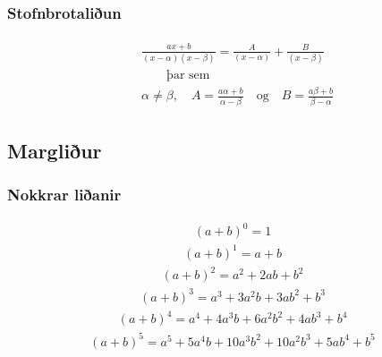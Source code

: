 \documentclass[a4paper,10pt,icelandic]{sphinxmanual}
\begin{document}
\subsubsection{Stofnbrotaliðun}
\label{\detokenize{Kafli12:stofnbrotaliun}}\begin{equation*}
\begin{split}\begin{aligned}
&\frac{ax+b}{(x-\alpha)(x-\beta)} = \frac{A}{(x-\alpha)}+ \frac{B}{(x-\beta)} \\
&\qquad \text{þar sem} \\
& \alpha \neq \beta, \quad A= \frac{a\alpha + b}{\alpha - \beta} \quad \text{og} \quad B= \frac{a\beta + b}{\beta - \alpha}
\end{aligned}\end{split}
\end{equation*}

\subsection{Margliður}
\label{\detokenize{Kafli12:margliur}}

\subsubsection{Nokkrar liðanir}
\label{\detokenize{Kafli12:nokkrar-lianir}}\begin{equation*}
\begin{split}(a + b)^0 = 1\end{split}
\end{equation*}\begin{equation*}
\begin{split}(a + b)^1 = a + b\end{split}
\end{equation*}\begin{equation*}
\begin{split}(a + b)^2 = a^2 + 2ab + b^2\end{split}
\end{equation*}\begin{equation*}
\begin{split}(a + b)^3 = a^3 + 3a^2 b + 3a b^2 + b^3\end{split}
\end{equation*}\begin{equation*}
\begin{split}(a + b)^4 = a^4 + 4 a^3 b + 6a^2 b^2 + 4ab^3 + b^4\end{split}
\end{equation*}\begin{equation*}
\begin{split}(a + b)^5 = a^5 + 5a^4 b + 10a^3b^2 + 10a^2 b^3 + 5 ab^4 +b^5\end{split}
\end{equation*}
\end{document}
